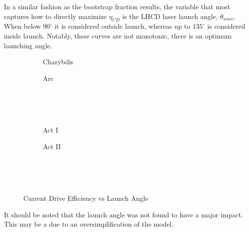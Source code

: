 In a similar fashion as the bootstrap fraction results, the variable that most captures how to directly maximize $\eta_{CD}$ is the LHCD laser launch angle, $\theta_{wave}$. When below $90 ^{\circ}$ it is considered outside launch, whereas up to $135 ^{\circ}$ is considered inside launch. Notably, these curves are not monotonic, there is an optimum launching angle.

\begin{figure*}[h!]
    \centering
    \hfill 
    \begin{subfigure}[t]{0.4\textwidth}
        \centering
    \begin{adjustbox}{width=\textwidth}
      \Large
      
    \end{adjustbox}
        \caption{Charybdis}
    \end{subfigure}
    \hfill
    \begin{subfigure}[t]{0.4\textwidth}
        \centering
    \begin{adjustbox}{width=\textwidth}
      \Large
      
    \end{adjustbox}
        \caption{Arc}
    \end{subfigure}
    \hfill \hfill ~\\ ~\\ ~\\
    \hfill 
    \begin{subfigure}[t]{0.4\textwidth}
        \centering
    \begin{adjustbox}{width=\textwidth}
      \Large
      
    \end{adjustbox}
        \caption{Act I}
    \end{subfigure}
    \hfill
    \begin{subfigure}[t]{0.4\textwidth}
        \centering
    \begin{adjustbox}{width=\textwidth}
      \Large
      
    \end{adjustbox}
        \caption{Act II}
    \end{subfigure}
    \hfill \hfill ~\\ ~\\ ~\\
    \caption{Current Drive Efficiency vs Launch Angle}
\end{figure*}

It should be noted that the launch angle was not found to have a major impact. This may be a due to an oversimplification of the model.

%
